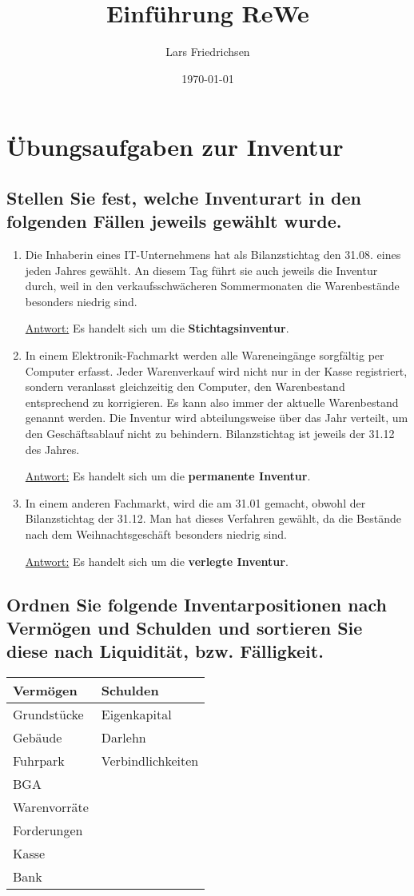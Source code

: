 \documentclass[a4paper,11pt]{scrartcl}	%
\title{Einführung ReWe}
\author{Lars Friedrichsen}
\date{\today}
\begin{document}
\section{Übungsaufgaben zur Inventur}
	
	\subsection{Stellen Sie fest, welche Inventurart in den folgenden Fällen jeweils gewählt wurde.}

	\begin{enumerate}
		\item Die Inhaberin eines IT-Unternehmens hat als Bilanzstichtag den 31.08. eines jeden Jahres gewählt.
			An diesem Tag führt sie auch jeweils die Inventur durch, weil in den verkaufsschwächeren Sommermonaten
			die Warenbestände besonders niedrig sind.\par
			\underline{Antwort:} Es handelt sich um die \textbf{Stichtagsinventur}.
		\item In einem Elektronik-Fachmarkt werden alle Wareneingänge sorgfältig per Computer erfasst. Jeder
			Warenverkauf wird nicht nur in der Kasse registriert, sondern veranlasst gleichzeitig den Computer,
			den Warenbestand entsprechend zu korrigieren. Es kann also immer der aktuelle Warenbestand genannt
			werden. Die Inventur wird abteilungsweise über das Jahr verteilt, um den Geschäftsablauf nicht
			zu behindern. Bilanzstichtag ist jeweils der 31.12 des Jahres.\par
			\underline{Antwort:} Es handelt sich um die \textbf{permanente Inventur}.
		\item In einem anderen Fachmarkt, wird die am 31.01 gemacht, obwohl der Bilanzstichtag der 31.12. Man hat dieses
			Verfahren gewählt, da die Bestände nach dem Weihnachtsgeschäft besonders niedrig sind.\par
			\underline{Antwort:} Es handelt sich um die \textbf{verlegte Inventur}.
	\end{enumerate}

	\subsection{Ordnen Sie folgende Inventarpositionen nach Vermögen und Schulden und sortieren Sie diese nach Liquidität,
		bzw. Fälligkeit.}

		\begin{tabular}{|l|l|}
			\hline
			\textbf{Vermögen} 	& 	\textbf{Schulden}\\ \hline
			Grundstücke 		& 	Eigenkapital\\ \hline
			Gebäude 		& 	Darlehn\\ \hline
			Fuhrpark 		& 	Verbindlichkeiten\\ \hline
			BGA 			& 	\ \\ \hline
			Warenvorräte 		& 	\ \\ \hline
			Forderungen 		& 	\ \\ \hline
			Kasse 			& 	\ \\ \hline
			Bank 			& 	\ \\ \hline
		\end{tabular}
\end{document}
